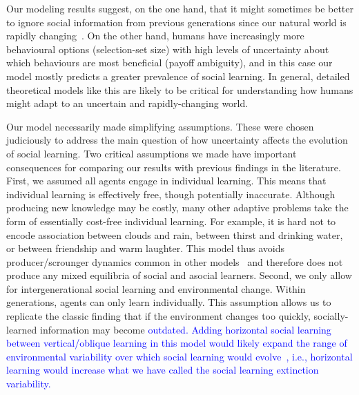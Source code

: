 \documentclass[letterpaper,11.5pt]{scrartcl}
\newcommand{\mt}[1]{{\textcolor{myorange} {({\tiny MT:} #1)}}}
\newcommand{\cm}[1]{{\textcolor{mypurple} {({\tiny CM:} #1)}}}
\newcommand{\edit}[1]{{\textcolor{blue} {#1}}}
\begin{document}
Our modeling results suggest, on the one hand, that it might sometimes be better to
ignore social information from previous generations since our natural world is
rapidly changing~\citep[e.g.,][]{IPCC2022}. On the other hand, humans have increasingly more behavioural options (selection-set size) with high levels of uncertainty about which behaviours are most beneficial (payoff ambiguity), and in this case our model mostly predicts a greater prevalence of social learning.
In general, detailed theoretical models like this are likely to be critical for understanding how humans might adapt to an uncertain and rapidly-changing world.

Our model necessarily made simplifying assumptions. These were chosen judiciously to address the main question of how uncertainty
affects the evolution of social learning. Two critical assumptions we made have important consequences for comparing our results
with previous findings in the literature. First, we assumed all agents engage in individual learning. This means that individual learning is effectively free, though
potentially inaccurate. Although producing new knowledge may be costly, many other adaptive problems take the form
of essentially cost-free individual learning. For example, it is hard not to encode association between clouds and
rain, between thirst and drinking water, or between friendship and warm laughter. This model thus avoids
producer/scrounger dynamics common in other models~\citep{BoydRicherson1985,Rogers1988} and therefore does not
produce any mixed equilibria of social and asocial learners.  Second, we only allow for intergenerational social
learning and environmental change. Within generations, agents can only learn individually. This assumption allows us
to replicate the classic finding that if the environment changes too quickly, socially-learned information may
become \edit{outdated. Adding horizontal social learning between vertical/oblique learning in this model would 
likely expand the range of environmental variability over which social learning would evolve~\citep{Turner2022},
i.e., horizontal learning would increase what we have called the social learning extinction variability.}
\end{document}

